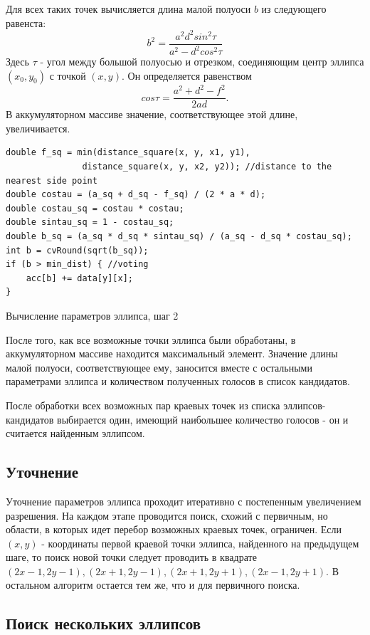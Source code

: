 Для всех таких точек вычисляется длина малой полуоси \(b\) из следующего равенста:
$$b^2 = \frac{a^2d^2sin^2\tau}{a^2-d^2cos^2\tau}$$
Здесь \(\tau\) - угол между большой полуосью и отрезком, соединяющим центр эллипса \((x_0, y_0)\) с точкой \((x, y)\). Он определяется равенством
$$cos\tau = \frac{a^2 + d^2 - f^2}{2ad}.$$
В аккумуляторном массиве значение, соответствующее этой длине, увеличивается.
\begin{ListingEnv}[H]
\begin{lstlisting}
double f_sq = min(distance_square(x, y, x1, y1),
               distance_square(x, y, x2, y2)); //distance to the nearest side point
double costau = (a_sq + d_sq - f_sq) / (2 * a * d);
double costau_sq = costau * costau;
double sintau_sq = 1 - costau_sq;
double b_sq = (a_sq * d_sq * sintau_sq) / (a_sq - d_sq * costau_sq);
int b = cvRound(sqrt(b_sq));
if (b > min_dist) { //voting
    acc[b] += data[y][x];
}
\end{lstlisting}
\caption{Вычисление параметров эллипса, шаг 2}
\label{list:minoraxis}
\end{ListingEnv}

После того, как все возможные точки эллипса были обработаны, в аккумуляторном массиве находится максимальный элемент. 
Значение длины малой полуоси, соответствующее ему, заносится вместе с остальными параметрами эллипса и количеством полученных голосов в список кандидатов.

После обработки всех возможных пар краевых точек из списка эллипсов-кандидатов выбирается один, имеющий наибольшее количество голосов - он и считается найденным эллипсом.

\subsection{Уточнение}
Уточнение параметров эллипса проходит итеративно с постепенным увеличением разрешения.
На каждом этапе проводится поиск, схожий с первичным, но области, в которых идет перебор возможных краевых точек, ограничен.
Если \((x, y)\) - координаты первой краевой точки эллипса, найденного на предыдущем шаге, то поиск новой точки следует 
проводить в квадрате \((2x - 1, 2y - 1), (2x + 1, 2y - 1), (2x + 1, 2y + 1), (2x - 1, 2y + 1)\). В остальном алгоритм остается тем же, что и для первичного поиска.

\subsection{Поиск нескольких эллипсов}

